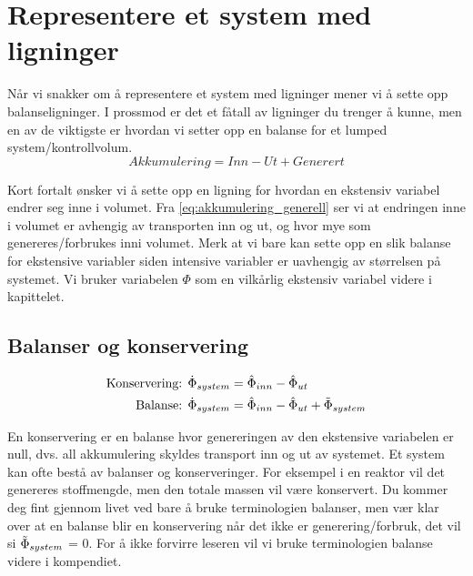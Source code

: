 \clearpage
\section{Representere et system med ligninger}\label{sec:massetransport}


Når vi snakker om å representere et system med ligninger mener vi å sette opp balanseligninger. I prossmod er det et fåtall av ligninger du trenger å kunne, men en av de viktigste er hvordan vi setter opp en balanse for et lumped system/kontrollvolum.
\begin{equation}
    \label{eq:akkumulering_generell}
    Akkumulering = Inn - Ut + Generert 
\end{equation}

Kort fortalt ønsker vi å sette opp en ligning for hvordan en ekstensiv variabel endrer seg inne i volumet. Fra \cref{eq:akkumulering_generell} ser vi at endringen inne i volumet er avhengig av transporten inn og ut, og hvor mye som genereres/forbrukes inni volumet. Merk at vi bare kan sette opp en slik balanse for ekstensive variabler siden intensive variabler er uavhengig av størrelsen på systemet. Vi bruker variabelen $\Phi$ som en vilkårlig ekstensiv variabel videre i kapittelet.  

\subsection{Balanser og konservering}\label{sec:balanser_konservering}
\begin{align} \label{eq:konservering_generell}
    \text{Konservering: }\dot{\Phi}_{system} &= \hat{\Phi}_{inn} - \hat{\Phi}_{ut} \\
    \label{eq:balanse_generell}
    \text{Balanse: }\dot{\Phi}_{system} &= \hat{\Phi}_{inn} - \hat{\Phi}_{ut} + \Tilde{\Phi}_{system}
\end{align}

En konservering er en balanse hvor genereringen av den ekstensive variabelen er null, dvs. all akkumulering skyldes transport inn og ut av systemet. Et system kan ofte bestå av balanser og konserveringer. For eksempel i en reaktor vil det genereres stoffmengde, men den totale massen vil være konservert.  Du kommer deg fint gjennom livet ved bare å bruke terminologien balanser, men vær klar over at en balanse blir en konservering når det ikke er generering/forbruk, det vil si $\Tilde{\Phi}_{system}$ = 0. For å ikke forvirre leseren vil vi bruke terminologien balanse videre i kompendiet.


